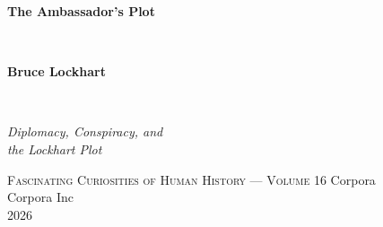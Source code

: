 \clearpage
\vspace*{1.5in}
\begin{center}
  \begin{minipage}{\textwidth}
    \centering
    \Huge\bfseries
    \linespread{1.25}\selectfont
    The Ambassador's Plot
  \end{minipage}
  \\[1em]
  {\LARGE\bfseries Bruce Lockhart\par}
  \\[3em]
  {\Large\itshape\linespread{1.3}\selectfont
  Diplomacy, Conspiracy, and\\
  the Lockhart Plot\par}
  \vspace{2em}
  {\small\scshape Fascinating Curiosities of Human History — Volume 16}
  \vfill
  {\large Corpora}
  \\[1em]
  {\large Corpora Inc}
  \\[1em]
  {\large 2026}
\end{center}
\clearpage
